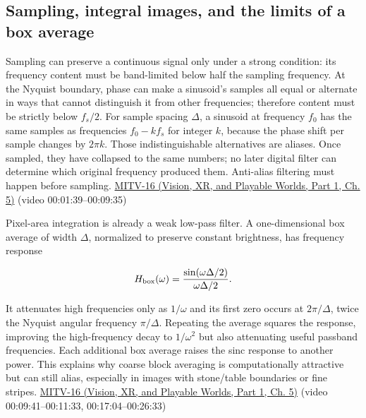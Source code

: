 \subsection{Sampling, integral images, and the limits of a box average}\label{03-visual-computing-i-ch004-sampling-integral-images-and-the-limits-of-a-box-average}

\hypertarget{03-visual-computing-i-ch004-sampling-integral-images-and-the-limits-of-a-box-average}{}

Sampling can preserve a continuous signal only under a strong condition: its frequency content must be band-limited below half the sampling frequency. At the Nyquist boundary, phase can make a sinusoid's samples all equal or alternate in ways that cannot distinguish it from other frequencies; therefore content must be strictly below \(f_s/2\). For sample spacing \(\Delta\), a sinusoid at frequency \(f_0\) has the same samples as frequencies \(f_0-kf_s\) for integer \(k\), because the phase shift per sample changes by \(2\pi k\). Those indistinguishable alternatives are aliases. Once sampled, they have collapsed to the same numbers; no later digital filter can determine which original frequency produced them. Anti-alias filtering must happen before sampling. \href{../07-Vision-XR-and-Playable-Worlds-P01/main.pdf\#nameddest=04-visual-computing-ii-ch036-mitv-16---fast-convolution-low-pass-filter-approximations-integral-images-us-6457032}{MITV-16 (Vision, XR, and Playable Worlds, Part 1, Ch. 5)} (video 00:01:39--00:09:35)

Pixel-area integration is already a weak low-pass filter. A one-dimensional box average of width \(\Delta\), normalized to preserve constant brightness, has frequency response

\[
H_{\rm box}(\omega)=\frac{\sin(\omega\Delta/2)}{\omega\Delta/2}.
\]

It attenuates high frequencies only as \(1/\omega\) and its first zero occurs at \(2\pi/\Delta\), twice the Nyquist angular frequency \(\pi/\Delta\). Repeating the average squares the response, improving the high-frequency decay to \(1/\omega^2\) but also attenuating useful passband frequencies. Each additional box average raises the sinc response to another power. This explains why coarse block averaging is computationally attractive but can still alias, especially in images with stone/table boundaries or fine stripes. \href{../07-Vision-XR-and-Playable-Worlds-P01/main.pdf\#nameddest=04-visual-computing-ii-ch036-mitv-16---fast-convolution-low-pass-filter-approximations-integral-images-us-6457032}{MITV-16 (Vision, XR, and Playable Worlds, Part 1, Ch. 5)} (video 00:09:41--00:11:33, 00:17:04--00:26:33)

